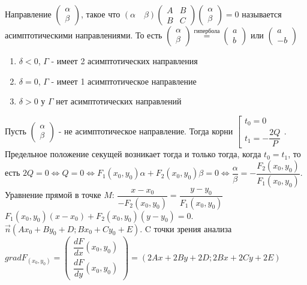 \begin{definition}
	Направление \(\begin{pmatrix}
		\alpha \\ \beta
	\end{pmatrix}\), такое что \((\alpha\quad \beta)\begin{pmatrix}
	A & B \\ B & C
	\end{pmatrix}\begin{pmatrix}
	\alpha \\ \beta
	\end{pmatrix}=0\) называется асимптотическими направлениями. То есть 
	\(\begin{pmatrix}
		\alpha \\ \beta
	\end{pmatrix}\overset{\text{гипербола}}{=}\begin{pmatrix}
	a \\ b
	\end{pmatrix} \text{ или } \begin{pmatrix}
	a \\ -b
	\end{pmatrix}\)
\end{definition}
\begin{proposition}
	\begin{enumerate}
		\item $\delta < 0$, $\Gamma$ - имеет 2 асимптотических направления
		\item $\delta=0$, $\Gamma$ - имеет 1 асимптотическое направление
		\item $\delta>0$ у $\Gamma$ нет асимптотических направлений
	\end{enumerate}
\end{proposition}
Пусть \(\begin{pmatrix}
	\alpha \\ \beta
\end{pmatrix}\) - не асимптотическое направление. Тогда корни $\left[\begin{gathered}
t_0 = 0 \\ t_1 = -\dfrac{2Q}{P}
\end{gathered}\right.$. Предельное положение секущей возникает тогда и только тогда, когда \(t_0 = t_1\), то есть \(2Q=0\Longleftrightarrow Q =0 \Longleftrightarrow F_1(x_0, y_0)\alpha+F_2(x_0, y_0)\beta = 0\Longleftrightarrow \dfrac{\alpha}{\beta} = - \dfrac{F_2(x_0, y_0)}{F_1(x_0, y_0)}\). Уравнение прямой в точке $M$: \(\dfrac{x-x_0}{-F_2(x_0, y_0)} = \dfrac{y - y_0}{F_1(x_0,y_0)}\) \newline
\(F_1(x_0, y_0)(x-x_0)+F_2(x_0, y_0)(y-y_0) = 0\). \(\vec n(Ax_0+By_0+D; Bx_0+Cy_0+E)\). C точки зрения анализа \(grad F_{(x_0,y_0)}=\begin{pmatrix}
\dfrac{dF}{dx}(x_0,y_0) \\ \dfrac{dF}{dy}(x_0,y_0)
\end{pmatrix} = (2Ax+2By+2D; 2Bx+2Cy+2E)\)